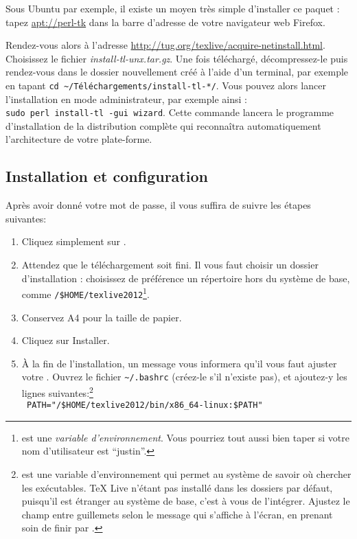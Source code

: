 Sous Ubuntu par exemple, il existe un moyen très simple d'installer ce paquet : tapez \url{apt://perl-tk} dans la barre d'adresse de votre navigateur web Firefox.

Rendez-vous alors à l'adresse \url{http://tug.org/texlive/acquire-netinstall.html}. Choisissez  le fichier \emph{install-tl-unx.tar.gz}. Une fois téléchargé, décompressez-le puis rendez-vous dans le dossier nouvellement créé à l'aide d'un terminal, par exemple en tapant \verb|cd ~/Téléchargements/install-tl-*/|. Vous pouvez alors lancer l'installation en mode administrateur, par exemple ainsi :\\
\verb|sudo perl install-tl -gui wizard|. Cette commande lancera le programme d'installation de la distribution complète qui reconnaîtra automatiquement l'architecture de votre plate-forme.

\subsection{Installation et configuration}

Après avoir donné votre mot de passe, il vous suffira de suivre les étapes suivantes:

\begin{enumerate}
\item Cliquez simplement sur .
\item Attendez que le téléchargement soit fini. Il vous faut choisir un dossier d'installation : choisissez de préférence un répertoire hors du système de base, comme \verb|/$HOME/texlive2012|\footnote{ est une \emph{variable d'environnement}. Vous pourriez tout aussi bien taper  si votre nom d'utilisateur est \enquote{justin}.}.
\item Conservez A4 pour la taille de papier.
\item Cliquez sur Installer.
\item À la fin de l'installation, un message vous informera qu'il vous faut ajuster votre . Ouvrez le fichier \verb|~/.bashrc| (créez-le s'il n'existe pas), et ajoutez-y les lignes suivantes:\footnote{ est une variable d'environnement qui permet au système de savoir où chercher les exécutables. TeX Live n'étant pas installé dans les dossiers par défaut, puisqu'il est étranger au système de base, c'est à vous de l'intégrer. Ajustez le champ entre guillemets selon le message qui s'affiche à l'écran, en prenant soin de finir par  .}\\
\verb| PATH="/$HOME/texlive2012/bin/x86_64-linux:$PATH"|
\end{enumerate}

